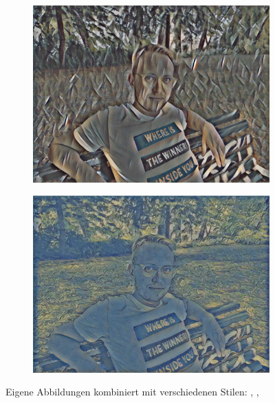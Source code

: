 \begin{figure}[H]
\begin{subfigure}[h]{0.24\textwidth}
        \includegraphics[width=\textwidth]{resources/content/experiments/ich-vgg16_still_life_with_liqueur_bottle.jpg}
    \end{subfigure}
    \begin{subfigure}[h]{0.24\textwidth}
        \centering
        \includegraphics[width=\textwidth]{resources/content/experiments/ich-vgg16_the_olive_trees.jpg}
    \end{subfigure}

    \caption{Eigene Abbildungen kombiniert mit verschiedenen Stilen: \cite{multicolored_abstract_artwork_img}, \cite{still_life_with_liqueur_bottle_img}, \cite{the_olive_trees_img}}
    \label{img:trained_models1}
\end{figure}